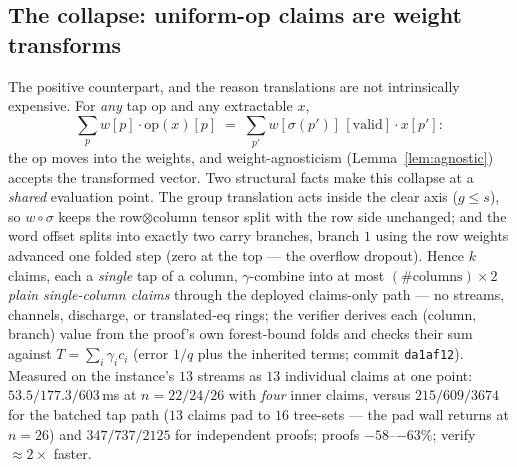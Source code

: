\documentclass[11pt]{article}
\theoremstyle{plain}
\theoremstyle{definition}
\theoremstyle{remark}
\begin{document}
\subsection{The collapse: uniform-op claims are weight transforms}
\label{sec:tapcollapse}

The positive counterpart, and the reason translations are not
intrinsically expensive. For \emph{any} tap $\mathrm{op}$ and any
extractable $x$,
\begin{equation}\label{eq:wtransform}
  \sum_p w[p]\cdot \mathrm{op}(x)[p]
  \;=\;\sum_{p'} w[\sigma(p')]\,[\mathrm{valid}]\cdot x[p'] :
\end{equation}
the op moves into the weights, and weight-agnosticism
(Lemma~\ref{lem:agnostic}) accepts the transformed vector. Two
structural facts make this collapse at a \emph{shared} evaluation
point. The group translation acts inside the clear axis ($g\le s$), so
$w\circ\sigma$ keeps the row$\otimes$column tensor split with the row
side unchanged; and the word offset splits into exactly two carry
branches, branch $1$ using the row weights advanced one folded step
(zero at the top --- the overflow dropout). Hence $k$ claims, each a
\emph{single} tap of a column, $\gamma$-combine into at most
$(\#\text{columns})\times 2$ \emph{plain single-column claims} through
the deployed claims-only path --- no streams, channels, discharge, or
translated-eq rings; the verifier derives each (column, branch) value
from the proof's own forest-bound folds and checks their sum against
$T=\sum_i\gamma_ic_i$ (error $1/q$ plus the inherited terms; commit
\texttt{da1af12}). Measured on the instance's $13$ streams as $13$
individual claims at one point: $53.5/177.3/603$\,ms at $n=22/24/26$
with \emph{four} inner claims, versus $215/609/3674$ for the batched
tap path ($13$ claims pad to $16$ tree-sets --- the pad wall returns at
$n{=}26$) and $347/737/2125$ for independent proofs; proofs
$-58$--$-63\%$; verify ${\approx}2\times$ faster.
\end{document}
